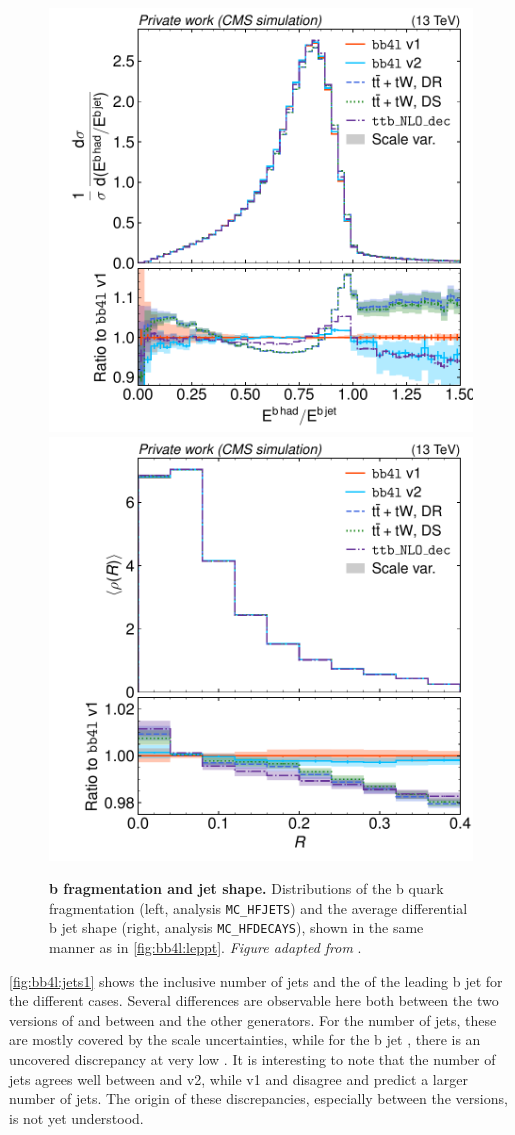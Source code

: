 \begin{figure}[tp]
    \centering
    \includegraphics[width=0.49 \textwidth]{figures/bb4l/generators/MC_HFJETS_efracB.pdf}
    \hfill
    \includegraphics[width=0.49 \textwidth]{figures/bb4l/generators/MC_HFDECAYS_avg_rho_B_jet.pdf}
    \caption{\textbf{b fragmentation and jet shape.} Distributions of the b quark fragmentation (left, \rivet analysis \texttt{MC\_HFJETS}) and the average differential b jet shape (right, \rivet analysis \texttt{MC\_HFDECAYS}), shown in the same manner as in \cref{fig:bb4l:leppt}. \textit{Figure adapted from }.}
    \label{fig:bb4l:jets2}
\end{figure}

\cref{fig:bb4l:jets1} shows the inclusive number of jets and the \pt of the leading b jet for the different cases. Several differences are observable here both between the two versions of \bbfourl and between \bbfourl and the other generators. For the number of jets, these are mostly covered by the scale uncertainties, while for the b jet \pt, there is an uncovered discrepancy at very low \pt. It is interesting to note that the number of jets agrees well between \tttWsum and \bbfourl v2, while \bbfourl v1 and \ttb disagree and predict a larger number of jets. The origin of these discrepancies, especially between the \bbfourl versions, is not yet understood.

